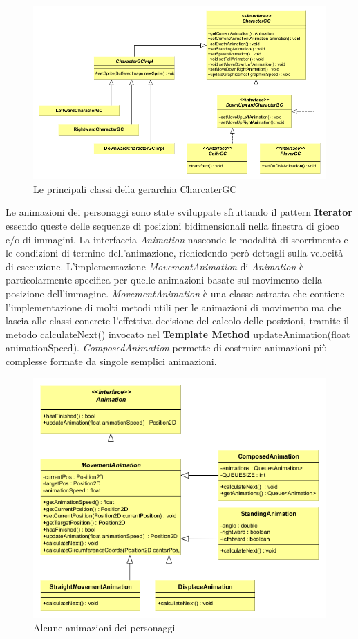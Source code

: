 \documentclass[a4paper,12pt]{report}
\begin{document}
\begin{figure}[H]
\centering{}
\includegraphics[width=\linewidth]{img/GerarchiaCGC}
\caption{Le principali classi della gerarchia CharcaterGC}
\label{img:GerarchiaCGC}
\end{figure}

Le animazioni dei personaggi sono state sviluppate sfruttando il pattern \textbf{Iterator} essendo queste delle sequenze di posizioni bidimensionali nella finestra di gioco e/o di immagini. La interfaccia \emph{Animation} nasconde le modalità di scorrimento e le condizioni di termine dell’animazione, richiedendo però dettagli sulla velocità di esecuzione. L’implementazione \emph{MovementAnimation} di \emph{Animation} è particolarmente specifica per quelle animazioni basate sul movimento della posizione dell'immagine. \emph{MovementAnimation} è una classe astratta che contiene l’implementazione di molti metodi utili per le animazioni di movimento ma che lascia alle classi concrete l’effettiva decisione del calcolo delle posizioni, tramite il metodo calculateNext() invocato nel \textbf{Template Method} updateAnimation(float animationSpeed). \emph{ComposedAnimation} permette di costruire animazioni più complesse formate da singole semplici animazioni.

\begin{figure}[H]
\centering{}
\includegraphics[width=\linewidth]{img/AnimazioniPersonaggi}
\caption{Alcune animazioni dei personaggi}
\label{img:AnimazioniPersonaggi}
\end{figure}
\end{document}
